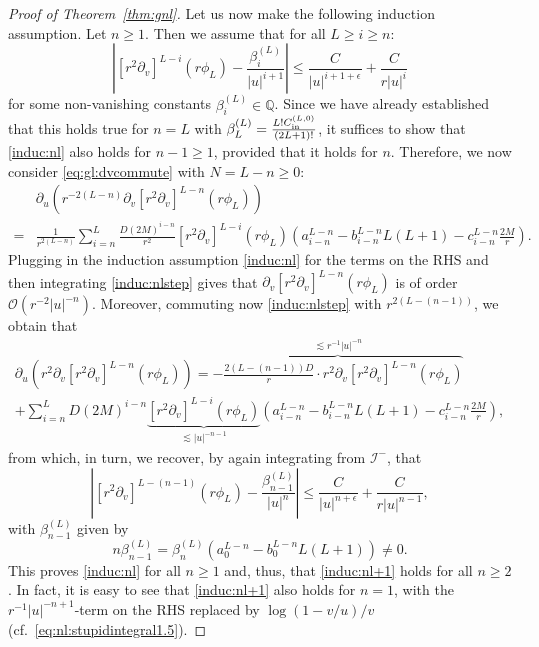 \documentclass[11pt,english]{article}
\numberwithin{equation}{section}
\theoremstyle{remark}
\theoremstyle{plain}
\theoremstyle{remark}
\newcommand{\pu}{\partial_u}
\newcommand{\pv}{\partial_v}
\renewcommand{\(}{\left(}
\renewcommand{\)}{\right)}
\begin{document}
\begin{proof}[Proof of Theorem~\ref{thm:gnl}]
Let us now make the following induction assumption. Let $n\geq 1$. Then we assume that for  all $L\geq i\geq n$:
\begin{equation}\label{induc:nl}
\left|[r^2\pv]^{L-i}(r\phi_L)-\frac{\beta_i^{(L)}}{|u|^{i+1}}\right|\leq \frac{C}{|u|^{i+1+\epsilon}}+\frac{C}{r|u|^i}
\end{equation}
for some non-vanishing constants $\beta_i^{(L)}\in\mathbb{Q}$.
Since we have already established that this holds true for $n=L$ with $\beta_{L}^{(L)}=\frac{L!C_{\mathrm{in}}^{(L,0)}}{(2L+1)!}$, it suffices to show that \eqref{induc:nl} also holds for $n-1\geq 1$, provided that it holds for $n$. Therefore, we now consider \eqref{eq:gl:dvcommute} with $N=L-n\geq 0$:
\begin{align}\label{induc:nlstep}
&\pu\left(r^{-2(L-n)}\pv[r^2\pv]^{L-n}(r\phi_L)\right)\\
=&\frac{1}{r^{2(L-n)}}\sum_{i=n}^L\frac{D(2M)^{i-n}}{r^2}[r^2\pv]^{L-i}(r\phi_L)\left(a_{i-n}^{L-n}-b_{i-n}^{L-n}L(L+1)-c_{i-n}^{L-n}\frac{2M}{r}\right)\nonumber.
\end{align}
Plugging in the induction assumption \eqref{induc:nl} for the terms on the RHS and then integrating \eqref{induc:nlstep} gives that $\pv[r^2\pv]^{L-n}(r\phi_L)$ is of order $\mathcal O(r^{-2}|u|^{-n})$. Moreover, commuting now \eqref{induc:nlstep} with $r^{2(L-(n-1))}$, we obtain that
\begin{multline}\label{induc:nlstep2}
\pu(r^2\pv[r^2\pv]^{L-n}(r\phi_L))=\overbrace{-\frac{2(L-(n-1))D}{r}\cdot r^2\pv[r^2\pv]^{L-n}(r\phi_L)}^{\lesssim r^{-1}|u|^{-n}}\\
+\sum_{i= n}^L D(2M)^{i-n}\underbrace{[r^2\pv]^{L-i}(r\phi_L)}_{\lesssim |u|^{-n-1}}\left(a_{i-n}^{L-n}-b_{i-n}^{L-n}L(L+1)-c_{i-n}^{L-n}\frac{2M}{r}\right),
\end{multline}
from which, in turn, we recover, by again integrating from $\mathcal{I}^-$, that
\begin{equation}\label{induc:nl+1}
\left|[r^2\pv]^{L-(n-1)}(r\phi_L)-\frac{\beta_{n-1}^{(L)}}{|u|^{n}}\right|\leq \frac{C}{|u|^{n+\epsilon}}+\frac{C}{r|u|^{n-1}},
\end{equation}
with $\beta_{n-1}^{(L)}$ given by
\begin{equation}\label{pindi}
n\beta_{n-1}^{(L)}={\beta_n^{(L)}}\left(a_0^{L-n}-b_0^{L-n}L(L+1)\right)\neq0.
\end{equation}
This proves \eqref{induc:nl} for all $n\geq 1$ and, thus, that \eqref{induc:nl+1} holds for all $n\geq 2$. 
In fact, it is easy to see that \eqref{induc:nl+1} also holds for $n=1$, with the $r^{-1}|u|^{-n+1}$-term on the RHS replaced by $\log(1-v/u)/v$ (cf.\ \eqref{eq:nl:stupidintegral1.5}).


\end{proof}
\end{document}
